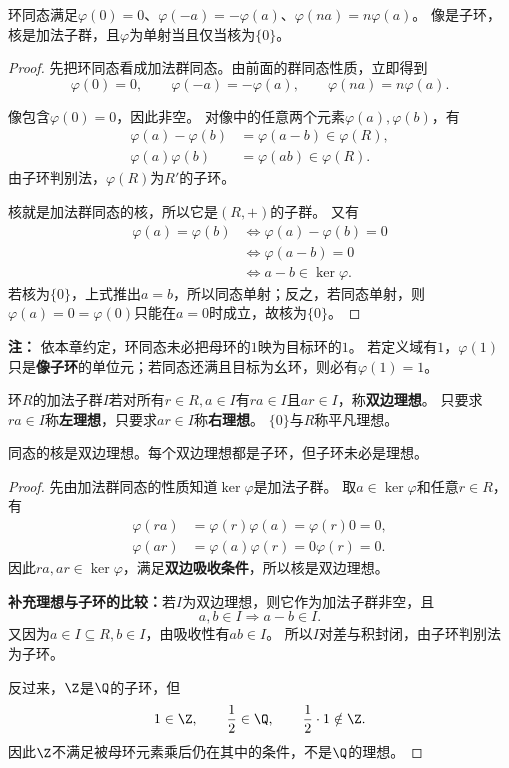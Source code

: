 \begin{proposition}
环同态满足$\varphi(0)=0$、$\varphi(-a)=-\varphi(a)$、$\varphi(na)=n\varphi(a)$。
像是子环，核是加法子群，且$\varphi$为单射当且仅当核为$\{0\}$。
\end{proposition}
\begin{proof}
先把环同态看成加法群同态。由前面的群同态性质，立即得到
\[
\varphi(0)=0,\qquad
\varphi(-a)=-\varphi(a),\qquad
\varphi(na)=n\varphi(a).
\]

像包含$\varphi(0)=0$，因此非空。
对像中的任意两个元素$\varphi(a),\varphi(b)$，有
\[
\begin{aligned}
\varphi(a)-\varphi(b)&=\varphi(a-b)\in\varphi(R),\\
\varphi(a)\varphi(b)&=\varphi(ab)\in\varphi(R).
\end{aligned}
\]
由子环判别法，$\varphi(R)$为$R'$的子环。

核就是加法群同态的核，所以它是$(R,+)$的子群。
又有
\[
\begin{aligned}
\varphi(a)=\varphi(b)
&\iff\varphi(a)-\varphi(b)=0\\
&\iff\varphi(a-b)=0\\
&\iff a-b\in\ker\varphi.
\end{aligned}
\]
若核为$\{0\}$，上式推出$a=b$，所以同态单射；反之，若同态单射，则
$\varphi(a)=0=\varphi(0)$只能在$a=0$时成立，故核为$\{0\}$。
\end{proof}

\textbf{注：}
依本章约定，环同态未必把母环的$1$映为目标环的$1$。
若定义域有$1$，$\varphi(1)$只是\textbf{像子环}的单位元；若同态还满且目标为幺环，则必有$\varphi(1)=1$。

\begin{definition}
环$R$的加法子群$I$若对所有$r\in R,a\in I$有$ra\in I$且$ar\in I$，称\textbf{双边理想}。
只要求$ra\in I$称\textbf{左理想}，只要求$ar\in I$称\textbf{右理想}。
$\{0\}$与$R$称平凡理想。
\end{definition}

\begin{proposition}
同态的核是双边理想。每个双边理想都是子环，但子环未必是理想。
\end{proposition}
\begin{proof}
先由加法群同态的性质知道$\ker\varphi$是加法子群。
取$a\in\ker\varphi$和任意$r\in R$，有
\[
\begin{aligned}
\varphi(ra)&=\varphi(r)\varphi(a)=\varphi(r)0=0,\\
\varphi(ar)&=\varphi(a)\varphi(r)=0\varphi(r)=0.
\end{aligned}
\]
因此$ra,ar\in\ker\varphi$，满足\textbf{双边吸收条件}，所以核是双边理想。

\textbf{补充理想与子环的比较：}若$I$为双边理想，则它作为加法子群非空，且
\[
a,b\in I\Longrightarrow a-b\in I.
\]
又因为$a\in I\subseteq R,b\in I$，由吸收性有$ab\in I$。
所以$I$对差与积封闭，由子环判别法为子环。

反过来，$\Z$是$\Q$的子环，但
\[
1\in\Z,\qquad \frac12\in\Q,\qquad \frac12\cdot1\notin\Z.
\]
因此$\Z$不满足被母环元素乘后仍在其中的条件，不是$\Q$的理想。
\end{proof}

